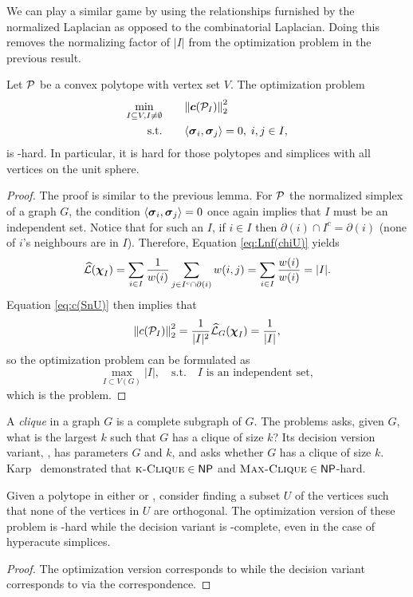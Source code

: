 We can play a similar game by using the relationships furnished by the normalized Laplacian as opposed to the combinatorial Laplacian. Doing this removes the normalizing factor of $|I|$ from the optimization problem in the previous result.  

\begin{lemma}
	Let $\P$ be a convex polytope with vertex set $V$. The optimization problem
	\begin{alignat*}{2}
	\min_{I\subset V, I\neq \emptyset} & \quad &&  {\norm{\cent(\P_I)}_2^2} \\
	\text{s.t.}&  &&  \la \sv_i,\sv_j\ra=0,\; i,j\in I,
	\end{alignat*}
	is \NP-hard. In particular, it is hard for those polytopes and simplices with all vertices on the unit sphere. 
\end{lemma}
\begin{proof}
	The proof is similar to the previous lemma. For $\P$ the normalized simplex of a graph $G$, the condition $\la \sv_i,\sv_j\ra=0$ once again implies that $I$ must be an independent set. Notice that for such an $I$, if $i\in I$ then $\partial(i) \cap I^c = \partial(i)$ (none of $i$'s neighbours are in $I$). Therefore, Equation \eqref{eq:Lnf(chiU)} yields 
	\begin{align*}
	\Lnf(\bchi_I)=\sum_{i\in I}\frac{1}{w(i)}\sum_{j\in I^c\cap \partial(i)} w(i,j) = \sum_{i\in I}\frac{w(i)}{w(i)} = |I|.
	\end{align*}
	Equation \eqref{eq:c(SnU)} then implies that 
	\[\norm{c(\P_I)}_2^2=\frac{1}{|I|^2}\Lnf_G(\bchi_I)=\frac{1}{|I|},\]
	so the optimization problem can be formulated as 
	\[\max_{I\subset V(G)} |I|,\quad  \text{s.t.} \quad I \text{ is an independent set},\]
	which is the \iset problem. 
\end{proof}

A \emph{clique} in a graph $G$ is a complete subgraph of $G$. The \maxclique problems asks, given  $G$, what is the  largest  $k$ such that $G$ has a clique of size $k$? Its decision version variant, \kclique, has parameters $G$ and $k$, and asks whether $G$ has a clique of size $k$. Karp~\cite{karp1972reducibility} demonstrated that $\kclique\in\NP$ and $\maxclique\in\NP$-hard.  

\begin{lemma}
	Given a polytope in either  \vdesc or \hdesc, consider finding a subset $U$ of the vertices such that none of the vertices in $U$ are orthogonal. The optimization version  of these problem is \NP-hard  while the  decision variant is \NP-complete, even in the case of hyperacute simplices. 
\end{lemma}
\begin{proof}
	The optimization version corresponds to \maxclique while the decision variant corresponds to \kclique via the correspondence.   
\end{proof}



